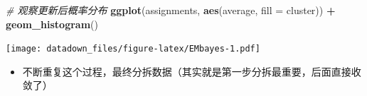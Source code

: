 \documentclass[]{book}
\newenvironment{Shaded}{\begin{snugshade}}{\end{snugshade}}
\newcommand{\CommentTok}[1]{\textcolor[rgb]{0.56,0.35,0.01}{\textit{#1}}}
\newcommand{\DataTypeTok}[1]{\textcolor[rgb]{0.13,0.29,0.53}{#1}}
\newcommand{\KeywordTok}[1]{\textcolor[rgb]{0.13,0.29,0.53}{\textbf{#1}}}
\newcommand{\NormalTok}[1]{#1}
\newcommand{\OperatorTok}[1]{\textcolor[rgb]{0.81,0.36,0.00}{\textbf{#1}}}
\newcommand{\StringTok}[1]{\textcolor[rgb]{0.31,0.60,0.02}{#1}}
\providecommand{\tightlist}{%
  \setlength{\itemsep}{0pt}\setlength{\parskip}{0pt}}
\begin{document}
\begin{Shaded}
\begin{Highlighting}[]
\CommentTok{# 观察更新后概率分布}
\KeywordTok{ggplot}\NormalTok{(assignments, }\KeywordTok{aes}\NormalTok{(average, }\DataTypeTok{fill =}\NormalTok{ cluster)) }\OperatorTok{+}
\StringTok{  }\KeywordTok{geom_histogram}\NormalTok{()}
\end{Highlighting}
\end{Shaded}

\texttt{[image: datadown\_files/figure-latex/EMbayes-1.pdf]}

\begin{itemize}
\tightlist
\item
  不断重复这个过程，最终分拆数据（其实就是第一步分拆最重要，后面直接收敛了）
\end{itemize}
\end{document}
